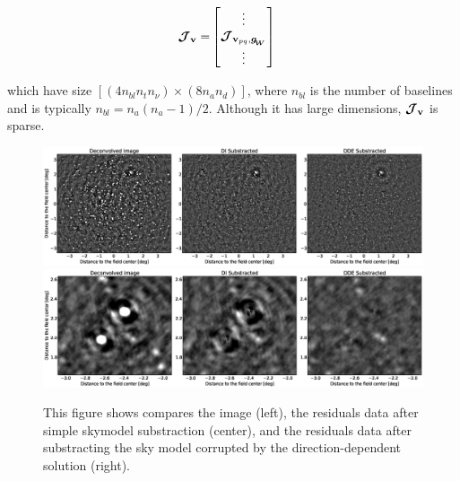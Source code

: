 \begin{alignat}{2}
\label{eq:J}
\bm{\mathcal{J}}_{\textbf{v}}=&
\begin{bmatrix} 
\vdots \\ 
\bm{\mathcal{J}}_{{\textbf{v}_{pq}},\bm{g_{\!_{W}}}}\\ 
\vdots \\ 
\end{bmatrix}
\end{alignat}

\noindent which have size $[(4n_{bl} n_t n_{\nu})\times (8n_a n_d)]$,
where $n_{bl}$ is the number of baselines and is typically
$n_{bl}=n_a(n_a-1)/2$. Although it has large dimensions, $\bm{\mathcal{J}}_{\textbf{v}}$ is
sparse.



\begin{figure}[ht!]
\begin{center}
\includegraphics[width=17cm]{resid.eps}
\includegraphics[width=17cm]{residZoom.eps}
\caption{\label{fig:resid} This figure shows compares the image
  (left), the residuals data after simple skymodel substraction
  (center), and the residuals data after substracting the
  sky model corrupted by the direction-dependent solution (right).}
\end{center}
\end{figure}

